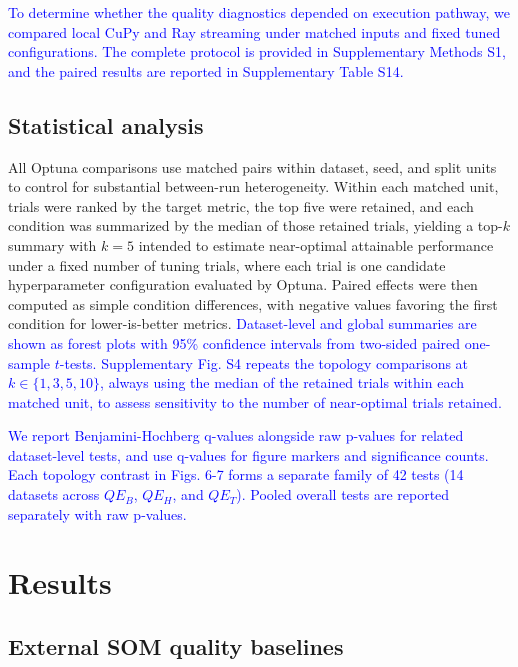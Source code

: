 \documentclass[10pt]{article} %
\newcommand{\TrackedChange}[1]{\textcolor{blue}{#1}}
\begin{document}
\TrackedChange{To determine whether the quality diagnostics depended on execution pathway, we compared local CuPy and Ray streaming under matched inputs and fixed tuned configurations.} \TrackedChange{The complete protocol is provided in Supplementary Methods S1, and the paired results are reported in Supplementary Table S14.}

\subsection{Statistical analysis}

All Optuna comparisons use matched pairs within dataset, seed, and split units to control for substantial between-run heterogeneity. Within each matched unit, trials were ranked by the target metric, the top five were retained, and each condition was summarized by the median of those retained trials, yielding a top-$k$ summary with $k=5$ intended to estimate near-optimal attainable performance under a fixed number of tuning trials, where each trial is one candidate hyperparameter configuration evaluated by Optuna. Paired effects were then computed as simple condition differences, with negative values favoring the first condition for lower-is-better metrics. \TrackedChange{Dataset-level and global summaries are shown as forest plots with 95\% confidence intervals from two-sided paired one-sample $t$-tests.} \TrackedChange{Supplementary Fig. S4 repeats the topology comparisons at $k\in\{1,3,5,10\}$, always using the median of the retained trials within each matched unit, to assess sensitivity to the number of near-optimal trials retained.}

\TrackedChange{We report Benjamini-Hochberg q-values alongside raw p-values for related dataset-level tests, and use q-values for figure markers and significance counts.} \TrackedChange{Each topology contrast in Figs. 6-7 forms a separate family of 42 tests (14 datasets across $QE_B$, $QE_H$, and $QE_T$).} \TrackedChange{Pooled overall tests are reported separately with raw p-values.}

\section{Results}

{\color{blue}\subsection{External SOM quality baselines}}
\end{document}
